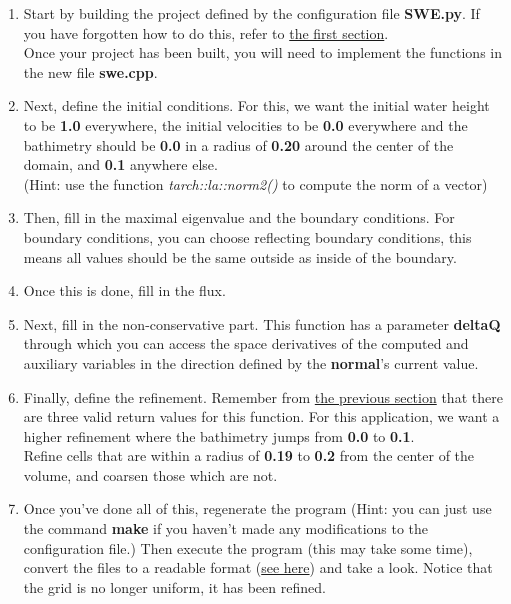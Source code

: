 \documentclass[12pt,letterpaper]{article}
\begin{document}
\begin{enumerate}
    \item
        Start by building the project defined by the configuration file \textbf{SWE.py}. If you have forgotten how to do this, refer to \hyperref[Verifying_and_building]{the first section}.\\
        
        Once your project has been built, you will need to implement the functions in the new file \textbf{swe.cpp}.
    \item
        Next, define the initial conditions. For this, we want the initial water height to be \textbf{1.0} everywhere, the initial velocities to be \textbf{0.0} everywhere and the bathimetry should be \textbf{0.0} in a radius of \textbf{0.20} around the center of the domain, and \textbf{0.1} anywhere else.\\
        (Hint: use the function \textit{tarch::la::norm2()} to compute the norm of a vector)
    \item
        Then, fill in the maximal eigenvalue and the boundary conditions. For boundary conditions, you can choose reflecting boundary conditions, this means all values should be the same outside as inside of the boundary.
    \item
        Once this is done, fill in the flux.
    \item
        Next, fill in the non-conservative part. This function has a parameter \textbf{deltaQ} through which you can access the space derivatives of the computed and auxiliary variables in the direction defined by the \textbf{normal}'s current value.
    \item
        Finally, define the refinement. Remember from \hyperref[refinement]{the previous section} that there are three valid return values for this function. For this application, we want a higher refinement where the bathimetry jumps from \textbf{0.0} to \textbf{0.1}.\\
        Refine cells that are within a radius of \textbf{0.19} to \textbf{0.2} from the center of the volume, and coarsen those which are not.
    \item
        Once you've done all of this, regenerate the program (Hint: you can just use the command \textbf{make} if you haven't made any modifications to the configuration file.) Then execute the program (this may take some time), convert the files to a readable format (\hyperref[Visualize]{see here}) and take a look. Notice that the grid is no longer uniform, it has been refined.
\end{enumerate}
\end{document}
